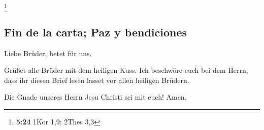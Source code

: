 \footnote{\textbf{5:24} 1Kor 1,9; 2Thes 3,3}

\hypertarget{fin-de-la-carta-paz-y-bendiciones}{%
\subsection{Fin de la carta; Paz y
bendiciones}\label{fin-de-la-carta-paz-y-bendiciones}}

 Liebe Brüder, betet für uns.

 Grüßet alle Brüder mit dem heiligen Kuss.
 Ich beschwöre euch bei dem Herrn, dass ihr diesen Brief
lesen lasset vor allen heiligen Brüdern.

 Die Gnade unseres Herrn Jesu Christi sei mit euch! Amen.
